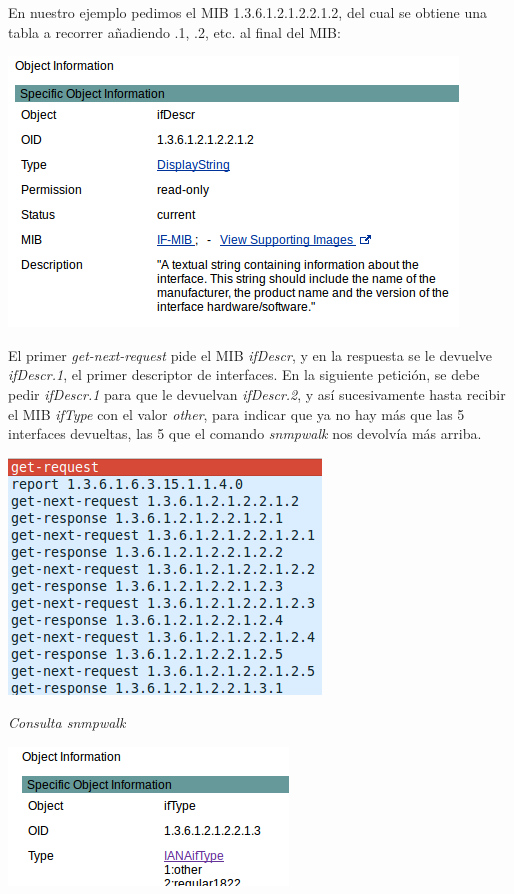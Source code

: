 \documentclass[]{article}
\begin{document}
En nuestro ejemplo pedimos el MIB 1.3.6.1.2.1.2.2.1.2, del cual se obtiene una tabla a recorrer añadiendo .1, .2, etc. al final del MIB:

\begin{center}
	\includegraphics[scale=0.75]{images/snmp/ifDescr.png}
\end{center}

El primer \textit{get-next-request} pide el MIB \textit{ifDescr}, y en la respuesta se le devuelve \textit{ifDescr.1}, el primer descriptor de interfaces. En la siguiente petición, se debe pedir \textit{ifDescr.1} para que le devuelvan \textit{ifDescr.2}, y así sucesivamente hasta recibir el MIB \textit{ifType} con el valor \textit{other}, para indicar que ya no hay más que las 5 interfaces devueltas, las 5 que el comando \textit{snmpwalk} nos devolvía más arriba.

\begin{center}
	\includegraphics[scale=0.75]{images/snmp/snmpMensajes.png}
	
	\textit{Consulta snmpwalk}
\end{center}

\begin{center}
	\includegraphics[scale=0.75]{images/snmp/iftypeother.png}
\end{center}
\end{document}
